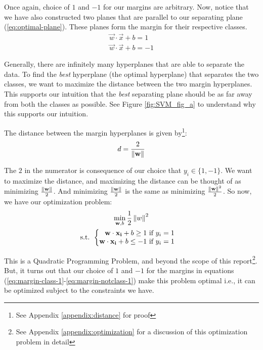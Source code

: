 Once again, choice of $1$ and $-1$ for our margins are arbitrary. Now, notice that we have also constructed two planes that are parallel to our separating plane (\ref{eq:optimal-plane}). These planes form the margin for their respective classes.
\begin{gather}
\vec{w}\cdot\vec{x} + b = 1 \label{eq:margin-class-1} \\
\vec{w}\cdot\vec{x} + b = -1 \label{eq:margin-notclass-1}
\end{gather}

Generally, there are infinitely many hyperplanes that are able to separate the data. To find the \textit{best} hyperplane (the optimal hyperplane) that separates the two classes, we want to maximize the distance between the two margin hyperplanes. This supports our intuition that the \textit{best} separating plane should be as far away from both the classes as possible. See Figure \ref{fig:SVM_fig_a} to understand why this supports our intuition.

The distance between the margin hyperplanes is given by\footnote{See Appendix \ref{appendix:distance} for proof}:
\begin{equation}
d = \frac{2}{\left\lVert\mathbf{w}\right\rVert} \label{eq:margin-dist}
\end{equation}

The $2$ in the numerator is consequence of our choice that $y_i \in \{1, -1\}$. We want to maximize the distance, and maximizing the distance can be thought of as minimizing $\frac{\left\lVert\mathbf{w}\right\rVert}{2}$. And minimizing $\frac{\left\lVert\mathbf{w}\right\rVert}{2}$ is the same as minimizing $\frac{\left\lVert\mathbf{w}\right\rVert^2}{2}$. So now, we have our optimization problem:
\begin{gather}
	\min_{\mathbf{w}, b} \frac{1}{2}\left\lVert w\right\rVert^2 \nonumber\\
	\text{s.t. }
	\begin{cases}
	\begin{aligned}
		\mathbf{w}\cdot\mathbf{x_i} + b \geq 1 \text{ if $y_i = 1$} \nonumber\\
		\mathbf{w}\cdot\mathbf{x_i} + b \leq -1 \text{ if $y_i = 1$} \nonumber
	\end{aligned}
	\end{cases}
\end{gather}

This is a Quadratic Programming Problem, and beyond the scope of this report\footnote{See Appendix \ref{appendix:optimization} for a discussion of this optimization problem in detail}. But, it turns out that our choice of $1$ and $-1$ for the margins in equations (\ref{eq:margin-class-1}-\ref{eq:margin-notclass-1}) make this problem optimal i.e., it can be optimized subject to the constraints we have.

